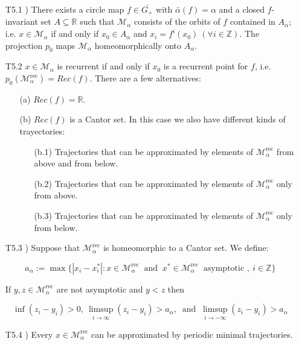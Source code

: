 \documentclass{article}
\begin{document}
	\begin{itemize}
		\item[T5.1 )] There exists a circle map $f \in \bar{G_{+}}$ with $\bar{\alpha} (f) = \alpha$ and a closed $f$-invariant set $A \subseteq \mathbb{R}$ such that $\mathcal{M}_{\alpha}$ consists of the orbits  of $f$ contained in $A_{\alpha}$; i.e. $x \in \mathcal{M}_{\alpha}$ if and only if $x_0 \in A_{\alpha}$ and $x_i = f^{i} (x_0) \ (\forall i \in \mathbb{Z})$. The projection $p_0$ maps $\mathcal{M}_{\alpha}$ homeomorphically onto $A_{\alpha}$.
		
		\item[T5.2] $x \in \mathcal{M}_{\alpha}$ is recurrent if and only if $x_0$ is a recurrent point for $f$, i.e. $p_0 ( \mathcal{M}_{\alpha}^{\text{rec}} ) = Rec(f)$. There are a few alternatives:
			\begin{itemize}
				\item[(a)] $Rec(f) = \mathbb{R}$.
				\item[(b)] $Rec(f)$ is a Cantor set. In this case we also have different kinds of trayectories:
					\begin{itemize}
						\item[(b.1)] Trajectories that can be approximated by elements of $\mathcal{M}_{\alpha}^{\text{rec}}$ from above and from below.
						\item[(b.2)] Trajectories that can be approximated by elements of $\mathcal{M}_{\alpha}^{\text{rec}}$ only from above.
						\item[(b.3)] Trajectories that can be approximated by elements of $\mathcal{M}_{\alpha}^{\text{rec}}$ only from below.
					\end{itemize}
			\end{itemize}
		
		
		\item[T5.3 )] Suppose that $\mathcal{M}_{\alpha}^{\text{rec}}$ is homeomorphic to a Cantor set. We define:
			
			$$
				a_{\alpha} := \max{  
				\{ | x_i - x_{i}^{*} | : x \in \mathcal{M}_{\alpha}^{\text{rec}} \ \text{ and } \ x^{*} \in \mathcal{M}_{\alpha}^{\text{rec}}	 \ \text{ asymptotic }, \ i \in \mathbb{Z}			 \}
				}
			$$
			
			If $y, z \in \mathcal{M}_{\alpha}^{\text{rec}}$ are not asymptotic and $y < z$ then
			
			$$
				\inf{( z_i - y_i )} > 0, \ \limsup_{i \rightarrow \infty } (z_i - y_i) > a_{\alpha}, \ \text{ and } \  \limsup_{i \rightarrow - \infty } (z_i - y_i) > a_{\alpha}
			$$
		\item[T5.4 )] Every $x \in \mathcal{M}_{\alpha}^{\text{rec}}$ can be approximated by periodic minimal trajectories.


	\end{itemize}
\end{document}
